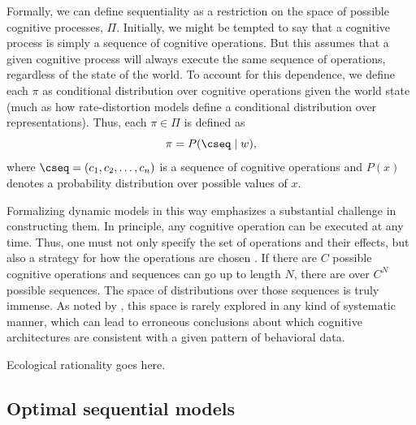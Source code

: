 Formally, we can define sequentiality as a restriction on the space of possible cognitive processes, $\Pi$. Initially, we might be tempted to say that a cognitive process is simply a sequence of cognitive operations. But this assumes that a given cognitive process will always execute the same sequence of operations, regardless of the state of the world. To account for this dependence, we define each $\pi$ as conditional distribution over cognitive operations given the world state (much as how rate-distortion models define a conditional distribution over representations). Thus, each $\pi \in \Pi$ is defined as
\begin{equation}\label{eq:intro-sequential}
   \pi = P(\cseq \mid w),
\end{equation}
where $\cseq = (c_1, c_2, \ldots, c_n)$ is a sequence of cognitive operations and $P(x)$ denotes a probability distribution over possible values of $x$.

Formalizing dynamic models in this way emphasizes a substantial challenge in constructing them. In principle, any cognitive operation can be executed at any time. Thus, one must not only specify the set of operations and their effects, but also a strategy for how the operations are chosen \citep{payne1988adaptive}. If there are $C$ possible cognitive operations and sequences can go up to length $N$, there are over $C^N$ possible sequences. The space of distributions over those sequences is truly immense. As noted by \citet{howes2009rational}, this space is rarely explored in any kind of systematic manner, which can lead to erroneous conclusions about which cognitive architectures are consistent with a given pattern of behavioral data.

Ecological rationality goes here.




\subsection{Optimal sequential models}

